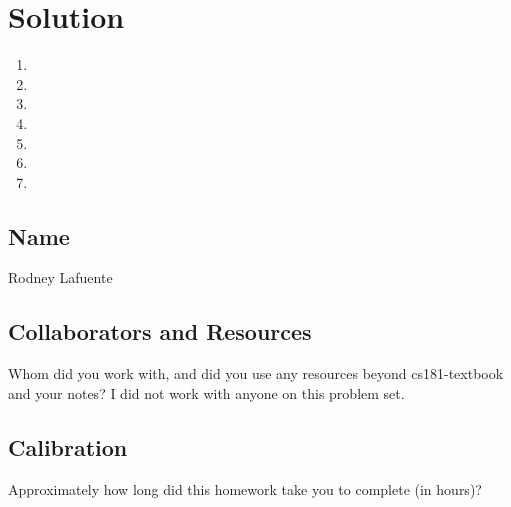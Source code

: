 \documentclass[submit]{harvardml}
\begin{document}
\newpage
\section*{Solution}
\begin{enumerate}
  \item 
  \item 
  \item 
  \item 
  \item 
  \item 
  \item 
\end{enumerate}

\newpage
\subsection*{Name}
Rodney Lafuente
\subsection*{Collaborators and Resources}
Whom did you work with, and did you use any resources beyond cs181-textbook and your notes?
I did not work with anyone on this problem set.
\subsection*{Calibration}
Approximately how long did this homework take you to complete (in hours)? 
\end{document}
